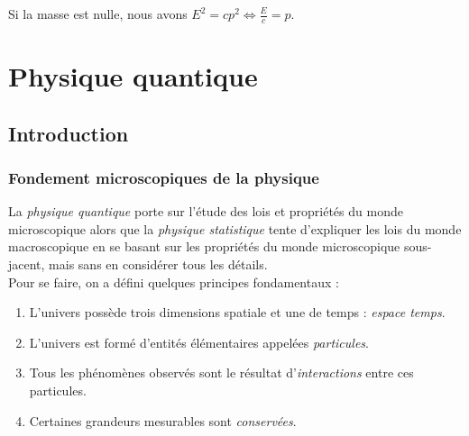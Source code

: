 \documentclass	[11pt, a4paper, openany]{book}
\begin{document}
Si la masse est nulle, nous avons $E^2 = cp^2 \Leftrightarrow \frac{E}{c} = p$.

\part{Physique quantique}
\chapter{Introduction}
\section{Fondement microscopiques de la physique}
La \textit{physique quantique} porte sur l'étude des lois et propriétés du monde microscopique alors que la \textit{physique statistique} tente d'expliquer les lois du monde macroscopique en se basant sur les propriétés du monde microscopique sous-jacent, mais sans en considérer tous les détails.\\
Pour se faire, on a défini quelques principes fondamentaux :
\begin{enumerate}
\item L'univers possède trois dimensions spatiale et une de temps : \textit{espace temps}.
\item L'univers est formé d'entités élémentaires appelées \textit{particules}.
\item Tous les phénomènes observés sont le résultat d'\textit{interactions} entre ces particules.
\item Certaines grandeurs mesurables sont \textit{conservées}.
\end{enumerate}
\end{document}
